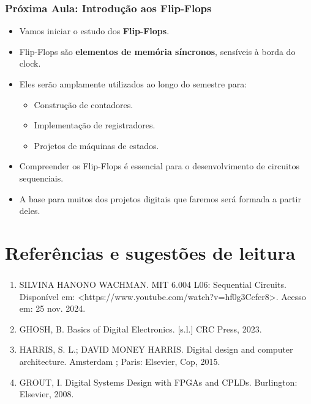 \documentclass{beamer}
\begin{document}
\begin{frame}
    \frametitle{Próxima Aula: Introdução aos Flip-Flops}

    \begin{itemize}
        \item Vamos iniciar o estudo dos \textbf{Flip-Flops}.
        \item Flip-Flops são \textbf{elementos de memória síncronos}, sensíveis à borda do clock.
        \item Eles serão amplamente utilizados ao longo do semestre para:
        \begin{itemize}
            \item Construção de contadores.
            \item Implementação de registradores.
            \item Projetos de máquinas de estados.
        \end{itemize}
        \item Compreender os Flip-Flops é essencial para o desenvolvimento de circuitos sequenciais.
        \item A base para muitos dos projetos digitais que faremos será formada a partir deles.
    \end{itemize}

    \vspace{0.5cm}

  
\end{frame}



\section{Referências e sugestões de leitura}
\begin{frame}
    \frametitle{\insertsection}
    \begin{enumerate}
        \item SILVINA HANONO WACHMAN. MIT 6.004 L06: Sequential Circuits. Disponível em: <https://www.youtube.com/watch?v=hf0g3Ccfer8>. Acesso em: 25 nov. 2024.
        \item GHOSH, B. Basics of Digital Electronics. [s.l.] CRC Press, 2023.
        \item HARRIS, S. L.; DAVID MONEY HARRIS. Digital design and computer architecture. Amsterdam ; Paris: Elsevier, Cop, 2015.
        \item GROUT, I. Digital Systems Design with FPGAs and CPLDs. Burlington: Elsevier, 2008.
    \end{enumerate}
\end{frame}
\end{document}
